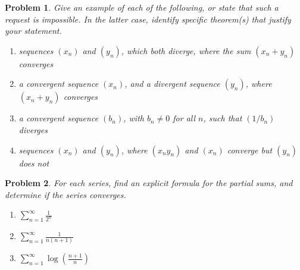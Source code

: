 \documentclass[12pt]{article}
\newtheorem{problem}{Problem}
\begin{document}
\begin{problem} %
Give an example of each of the following, or state that such a request is impossible.  In the latter case, identify specific theorem(s) that justify your statement.

\renewcommand{\labelenumi}{(\alph{enumi})}
\begin{enumerate}
\item sequences $(x_n)$ and $(y_n)$, which both diverge, where the sum $(x_n+y_n)$ converges


\item a convergent sequence $(x_n)$, and a divergent sequence $(y_n)$, where $(x_n+y_n)$ converges


\item a convergent sequence $(b_n)$, with $b_n\ne 0$ for all $n$, such that $(1/b_n)$ diverges


\item sequences $(x_n)$ and $(y_n)$, where $(x_n y_n)$ and $(x_n)$ converge but $(y_n)$ does not


\end{enumerate}
\end{problem}


\begin{problem} %
For each series, find an explicit formula for the partial sums, and determine if the series converges.

\renewcommand{\labelenumi}{(\alph{enumi})}
\begin{enumerate}
\item $\displaystyle \sum_{n=1}^\infty \frac{1}{2^n}$


\item $\displaystyle \sum_{n=1}^\infty \frac{1}{n(n+1)}$


\item $\displaystyle \sum_{n=1}^\infty \log\left(\frac{n+1}{n}\right)$


\end{enumerate}
\end{problem}
\end{document}
